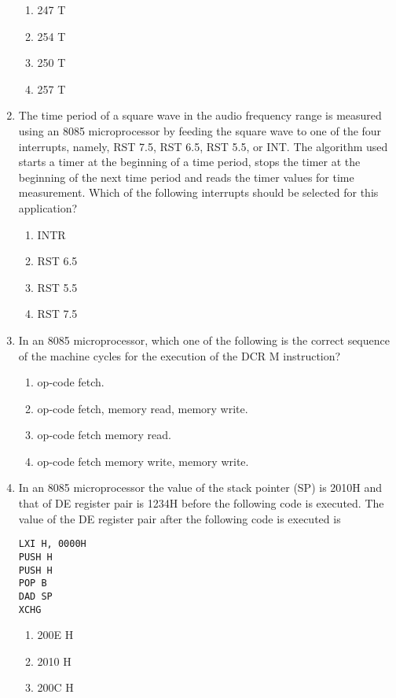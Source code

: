 \documentclass[journal,12pt,twocolumn]{IEEEtran}
\begin{document}
\begin{enumerate}
 \begin{enumerate}
      \item 247 T
      \item 254 T
      \item 250 T
      \item 257 T
    \end{enumerate}
    \item The time period of a square wave in the audio frequency range is measured using an 8085
microprocessor by feeding the square wave to one of the four interrupts, namely, RST 7.5, RST
6.5, RST 5.5, or INT. The algorithm used starts a timer at the beginning of a time period, stops
the timer at the beginning of the next time period and reads the timer values for time
measurement. Which of the following interrupts should be selected for this application?\\
     \begin{enumerate}
      \item INTR
      \item RST 6.5
      \item RST 5.5
      \item RST 7.5
    \end{enumerate}
    \item In an 8085 microprocessor, which one of the following is the correct sequence of the machine
cycles for the execution of the DCR M instruction? 
 \begin{enumerate}
      \item op-code fetch. 
      \item op-code fetch, memory read, memory write.
      \item op-code fetch memory read.
      \item op-code fetch memory write, memory write.
    \end{enumerate} 
    \item In an 8085 microprocessor the value of the stack pointer (SP) is 2010H and that of DE register pair is 1234H before the following code is executed. The value of the DE register pair after the
following code is executed is \\
\begin{verbatim}
LXI H, 0000H
PUSH H
PUSH H
POP B
DAD SP
XCHG
\end{verbatim}
     \begin{enumerate}
      \item 200E H
      \item 2010 H
      \item 200C H

\end{enumerate}
\end{enumerate}
\end{document}

